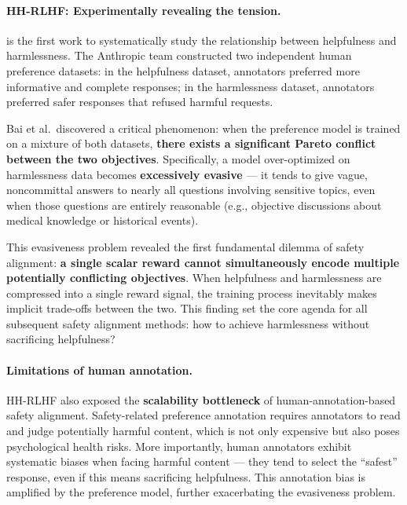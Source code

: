 \paragraph{HH-RLHF: Experimentally revealing the tension.}
 is the first work to systematically study the relationship between helpfulness and harmlessness.
The Anthropic team constructed two independent human preference datasets:
in the helpfulness dataset, annotators preferred more informative and complete responses;
in the harmlessness dataset, annotators preferred safer responses that refused harmful requests.

\begin{problembox}
Bai et al.\ discovered a critical phenomenon:
when the preference model is trained on a mixture of both datasets,
\textbf{there exists a significant Pareto conflict between the two objectives}.
Specifically, a model over-optimized on harmlessness data becomes \textbf{excessively evasive} ---
it tends to give vague, noncommittal answers to nearly all questions involving sensitive topics,
even when those questions are entirely reasonable (e.g., objective discussions about medical knowledge or historical events).
\end{problembox}

\noindent
This evasiveness problem revealed the first fundamental dilemma of safety alignment:
\textbf{a single scalar reward cannot simultaneously encode multiple potentially conflicting objectives}.
When helpfulness and harmlessness are compressed into a single reward signal,
the training process inevitably makes implicit trade-offs between the two.
This finding set the core agenda for all subsequent safety alignment methods:
how to achieve harmlessness without sacrificing helpfulness?

\paragraph{Limitations of human annotation.}
HH-RLHF also exposed the \textbf{scalability bottleneck} of human-annotation-based safety alignment.
Safety-related preference annotation requires annotators to read and judge potentially harmful content,
which is not only expensive but also poses psychological health risks.
More importantly, human annotators exhibit systematic biases when facing harmful content ---
they tend to select the ``safest'' response, even if this means sacrificing helpfulness.
This annotation bias is amplified by the preference model,
further exacerbating the evasiveness problem.


